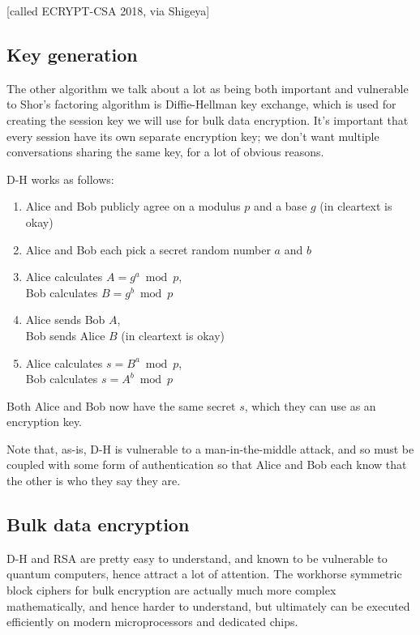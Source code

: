 \documentclass[%
 aip,
 jmp,%
 amsmath,amssymb,
 reprint,%
]{revtex4-1}
\begin{document}
[called ECRYPT-CSA 2018, via Shigeya]

\subsection{Key generation}

The other algorithm we talk about a lot as being both important and
vulnerable to Shor's factoring algorithm is Diffie-Hellman key
exchange, which is used for creating the session key we will use for
bulk data encryption.  It's important that every session have its own
separate encryption key; we don't want multiple conversations sharing
the same key, for a lot of obvious reasons.

D-H works as follows:

\begin{enumerate}
  \item Alice and Bob publicly agree on a modulus $p$ and a base $g$ (in cleartext is okay)
  \item Alice and Bob each pick a secret random number $a$ and $b$
  \item Alice calculates $A = g^a \bmod p$, \\
    Bob calculates $B = g^b \bmod p$
  \item Alice sends Bob $A$, \\
Bob sends Alice $B$ (in cleartext is okay)
  \item Alice calculates $s = B^a \bmod p$, \\
	   Bob calculates $s = A^b \bmod p$
\end{enumerate}

Both Alice and Bob now have the same secret $s$, which they can use as
an encryption key.

Note that, as-is, D-H is vulnerable to a man-in-the-middle attack, and
so must be coupled with some form of authentication so that Alice and
Bob each know that the other is who they say they are.

\subsection{Bulk data encryption}

D-H and RSA are pretty easy to understand, and known to be vulnerable
to quantum computers, hence attract a lot of attention. The workhorse
symmetric block ciphers for bulk encryption are actually much more
complex mathematically, and hence harder to understand, but ultimately
can be executed efficiently on modern microprocessors and dedicated
chips.
\end{document}
